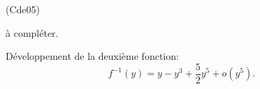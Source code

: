 \begin{tiny}(Cde05)\end{tiny} à compléter.

Développement de la deuxième fonction:
\[
 f^{-1}(y) = y - y^3 + \frac{5}{2}y^5 + o(y^5).
\]
